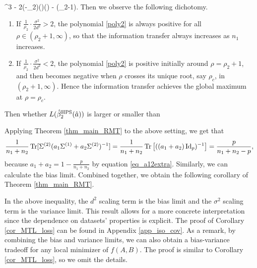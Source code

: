 \be\label{poly2}
 \cdot {} \rho^3 - 2(\rho-\rho_2)()()   - (\rho_2-1)\rho .\ee
Then we observe the following dichotomy. %
\begin{enumerate}
\item If $\frac{1}{\rho_2}\cdot \frac{\sigma^2}{2d^2} > 2$, the polynomial \eqref{poly2} is always positive for all $\rho\in (\rho_2+1,\infty)$, so that the information transfer always increases as $n_1$ increases.

\item If $\frac{1}{\rho_2}\cdot \frac{\sigma^2}{2d^2} < 2$, the polynomial \eqref{poly2} is positive initially around $\rho=\rho_2+1$, and then becomes negative when $\rho$ crosses its unique root, say $\rho_c$, in $(\rho_2+1,\infty)$. Hence the information transfer achieves the global maximum at $\rho=\rho_c$.
\end{enumerate}

\iffalse
Then whether $L(\hat{\beta}_2^{\textup{HPS}}(\hat a)) $ is larger or smaller than

Applying Theorem \ref{thm_main_RMT} to the above setting, we get that
	\begin{align*}
		\frac{1}{n_1 + n_2} \tr[\Sigma^{(2)} (a_1\Sigma^{(1)} + a_2\Sigma^{(2)})^{-1}]
		= \frac{1}{n_1 + n_2} \bigtr{((a_1 + a_2)\id_p)^{-1}}
		= \frac{p}{n_1 + n_2 - p},
	\end{align*}
	because $a_1 + a_2 = 1 - \frac{p}{n_1 + n_2}$ by equation \eqref{eq_a12extra}.
	Similarly, we can calculate the bias limit.
	Combined together, we obtain the following corollary of Theorem \ref{thm_main_RMT}.

In the above inequality, the $d^2$ scaling term is the bias limit and the $\sigma^2$ scaling term is the variance limit.
This result allows for a more concrete interpretation since the dependence on datasets' properties is explicit.
The proof of Corollary \ref{cor_MTL_loss} can be found in Appendix \ref{app_iso_cov}.
As a remark, %
by combining the bias and variance limits, we can also obtain a bias-variance tradeoff for any local minimizer of $f(A, B)$.
The proof is similar to Corollary \ref{cor_MTL_loss}, so we omit the details.

